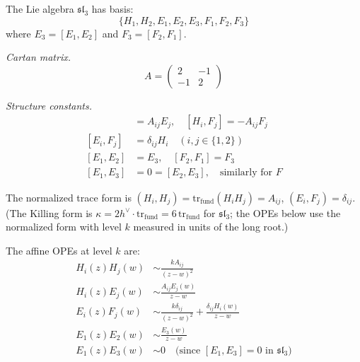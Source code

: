 \begin{computation}\label{comp:sl3-ope}
The Lie algebra $\mathfrak{sl}_3$ has basis:
\[
\{H_1, H_2, E_1, E_2, E_3, F_1, F_2, F_3\}
\]
where $E_3 = [E_1, E_2]$ and $F_3 = [F_2, F_1]$.

\emph{Cartan matrix.}
\[
A = \begin{pmatrix} 2 & -1 \\ -1 & 2 \end{pmatrix}
\]

\emph{Structure constants.}
\begin{align*}
[H_i, E_j] &= A_{ij} E_j, \quad [H_i, F_j] = -A_{ij} F_j \\
[E_i, F_j] &= \delta_{ij} H_i \quad (i,j \in \{1,2\}) \\
[E_1, E_2] &= E_3, \quad [F_2, F_1] = F_3 \\
[E_1, E_3] &= 0 = [E_2, E_3], \quad \text{similarly for } F
\end{align*}

The normalized trace form is $(H_i, H_j) = \mathrm{tr}_{\mathrm{fund}}(H_i H_j) = A_{ij}$, $(E_i, F_j) = \delta_{ij}$.
(The Killing form is $\kappa = 2h^\vee \cdot \mathrm{tr}_{\mathrm{fund}} = 6\,\mathrm{tr}_{\mathrm{fund}}$ for $\mathfrak{sl}_3$;
the OPEs below use the normalized form with level $k$ measured in units of the long root.)

The affine OPEs at level $k$ are:
\begin{align*}
H_i(z) H_j(w) &\sim \frac{kA_{ij}}{(z-w)^2} \\
H_i(z) E_j(w) &\sim \frac{A_{ij} E_j(w)}{z-w} \\
E_i(z) F_j(w) &\sim \frac{k\delta_{ij}}{(z-w)^2} + \frac{\delta_{ij} H_i(w)}{z-w} \\
E_1(z) E_2(w) &\sim \frac{E_3(w)}{z-w} \\
E_1(z) E_3(w) &\sim 0 \quad \text{(since $[E_1, E_3] = 0$ in $\mathfrak{sl}_3$)}
\end{align*}
\end{computation}

